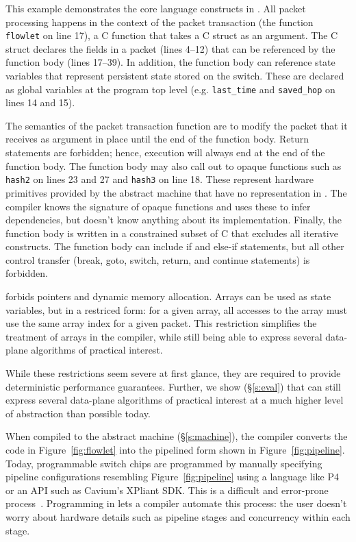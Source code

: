 This example demonstrates the core language constructs in \pktlanguage. All
packet processing happens in the context of the packet transaction (the
function \texttt{flowlet} on line 17), a C function that takes a C struct as an
argument. The C struct declares the fields in a packet (lines 4--12) that can
be referenced by the function body (lines 17--39).  In addition, the function
body can reference state variables that represent persistent state stored on
the switch. These are declared as global variables at the program top level
(e.g. \texttt{last\_time} and \texttt{saved\_hop} on lines 14 and 15).

The semantics of the packet transaction function are to modify the packet that
it receives as argument in place until the end of the function body. Return
statements are forbidden; hence, execution will always end at the end of
the function body. The function body may also call out to opaque functions such
as \texttt{hash2} on lines 23 and 27 and \texttt{hash3} on line 18. These
represent hardware primitives provided by the abstract machine that have no
representation in \pktlanguage. The \pktlanguage compiler knows the signature
of opaque functions and uses these to infer dependencies, but doesn't know
anything about its implementation. Finally, the function body is written in a
constrained subset of C that excludes all iterative constructs. The function
body can include if and else-if statements, but all other control transfer
(break, goto, switch, return, and continue statements) is forbidden.

\pktlanguage forbids pointers and dynamic memory allocation. Arrays can be used
as state variables, but in a restriced form: for a given array, all accesses to
the array must use the same array index for a given packet. This restriction
simplifies the treatment of arrays in the compiler, while still being able to
express several data-plane algorithms of practical interest.

While these restrictions seem severe at first glance, they are required to
provide deterministic performance guarantees. Further, we show (\S\ref{s:eval})
that \pktlanguage can still express several data-plane algorithms  of practical
interest at a much higher level of abstraction than possible today.

When compiled to the \absmachine abstract machine (\S\ref{s:machine}), the
\pktlanguage compiler converts the code in Figure~\ref{fig:flowlet} into the
pipelined form shown in Figure~\ref{fig:pipeline}. Today, programmable switch
chips are programmed by manually specifying pipeline configurations resembling
Figure~\ref{fig:pipeline} using a language like P4 or an API such as Cavium's
XPliant SDK. This is a difficult and error-prone process~\cite{p4-semantics}.
Programming in \pktlanguage lets a compiler automate this process:
the user doesn't worry about hardware details such as pipeline stages and
concurrency within each stage.
